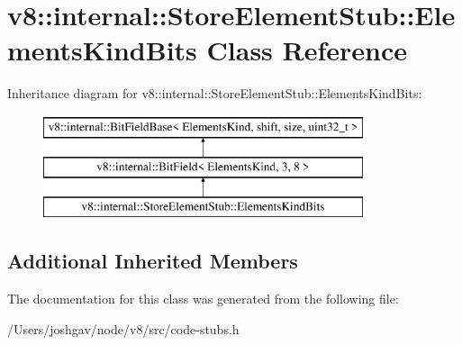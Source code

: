 \hypertarget{classv8_1_1internal_1_1_store_element_stub_1_1_elements_kind_bits}{}\section{v8\+:\+:internal\+:\+:Store\+Element\+Stub\+:\+:Elements\+Kind\+Bits Class Reference}
\label{classv8_1_1internal_1_1_store_element_stub_1_1_elements_kind_bits}
Inheritance diagram for v8\+:\+:internal\+:\+:Store\+Element\+Stub\+:\+:Elements\+Kind\+Bits\+:\begin{figure}[H]
\begin{center}
\leavevmode
\includegraphics[height=3.000000cm]{classv8_1_1internal_1_1_store_element_stub_1_1_elements_kind_bits}
\end{center}
\end{figure}
\subsection*{Additional Inherited Members}


The documentation for this class was generated from the following file\+:\begin{DoxyCompactItemize}
\item 
/\+Users/joshgav/node/v8/src/code-\/stubs.\+h\end{DoxyCompactItemize}
